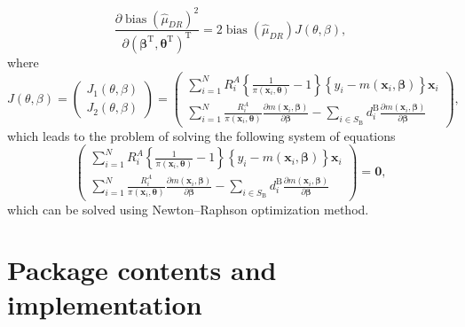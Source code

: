 \documentclass[
]{jss}
\begin{document}
\begin{equation*}
\frac{\partial \operatorname{bias}\left(\hat{\mu}_{D R}\right)^2}{\partial\left(\boldsymbol{\beta}^{\mathrm{T}}, \boldsymbol{\theta}^{\mathrm{T}}\right)^{\mathrm{T}}}=2 \operatorname{bias}\left(\hat{\mu}_{D R}\right) J(\theta, \beta),
\end{equation*} where \begin{equation*}
J(\theta, \beta)=\left(\begin{array}{l}
J_1(\theta, \beta) \\
J_2(\theta, \beta)
\end{array}\right)=\left(\begin{array}{c}
\sum_{i=1}^N R_i^A\left\{\frac{1}{\pi\left(\boldsymbol{x}_i, \boldsymbol{\theta}\right)}-1\right\}\left\{y_i-m\left(\boldsymbol{x}_i, \boldsymbol{\beta}\right)\right\} \boldsymbol{x}_i \\
\sum_{i=1}^N \frac{R_i^A}{\pi\left(\boldsymbol{x}_i, \boldsymbol{\theta}\right)} \frac{\partial m\left(\boldsymbol{x}_i, \boldsymbol{\beta}\right)}{\partial \boldsymbol{\beta}}-\sum_{i \in S_{\mathrm{B}}} d_i^{\mathrm{B}} \frac{\partial m\left(\boldsymbol{x}_i, \boldsymbol{\beta}\right)}{\partial \boldsymbol{\beta}}
\end{array}\right),
\end{equation*} which leads to the problem of solving the following
system of equations \begin{equation}
\label{bias-min}
    \left(\begin{array}{c}
\sum_{i=1}^N R_i^A\left\{\frac{1}{\pi\left(\boldsymbol{x}_i, \boldsymbol{\theta}\right)}-1\right\}\left\{y_i-m\left(\boldsymbol{x}_i, \boldsymbol{\beta}\right)\right\} \boldsymbol{x}_i \\
\sum_{i=1}^N \frac{R_i^A}{\pi\left(\boldsymbol{x}_i, \boldsymbol{\theta}\right)} \frac{\partial m\left(\boldsymbol{x}_i, \boldsymbol{\beta}\right)}{\partial \boldsymbol{\beta}}-\sum_{i \in S_{\mathrm{B}}} d_i^{\mathrm{B}} \frac{\partial m\left(\boldsymbol{x}_i, \boldsymbol{\beta}\right)}{\partial \boldsymbol{\beta}}
\end{array}\right) = \boldsymbol{0},
\end{equation} which can be solved using Newton--Raphson optimization
method.

\section{Package contents and
implementation}\label{package-contents-and-implementation}
\end{document}
